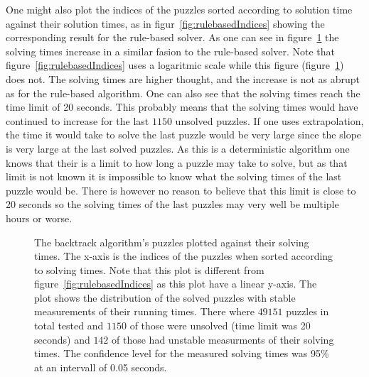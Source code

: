 \documentclass[a4paper,11pt]{kth-mag}
\begin{document}
\FloatBarrier
One might also plot the indices of the puzzles sorted according to solution time against their solution times, as in figur~\ref{fig:rulebasedIndices} showing the corresponding result for the rule-based solver.
As one can see in figure~\ref{fig:backtrackIndices} the solving times increase in a similar fasion to the rule-based solver.
Note that figure~\ref{fig:rulebasedIndices} uses a logaritmic scale while this figure (figure~\ref{fig:backtrackIndices}) does not.
The solving times are higher thought, and the increase is not as abrupt as for the rule-based algorithm.
One can also see that the solving times reach the time limit of 20 seconds.
This probably means that the solving times would have continued to increase for the last $1150$ unsolved puzzles.
If one uses extrapolation, the time it would take to solve the last puzzle would be very large since the slope is very large at the last solved puzzles. 
As this is a deterministic algorithm one knows that their is a limit to how long a puzzle may take to solve, but as that limit is not known it is impossible to know what the solving times of the last puzzle would be.
There is however no reason to believe that this limit is close to 20 seconds so the solving times of the last puzzles may very well be multiple hours or worse.
\\
\begin{figure}[here] 
\noindent{}
\vspace{-15pt}
\caption{The backtrack algorithm's puzzles plotted against their solving times. The x-axis is the indices of the puzzles when sorted according to solving times. Note that this plot is different from figure~\ref{fig:rulebasedIndices} as this plot have a linear y-axis. The plot shows the distribution of the solved puzzles with stable measurements of their running times. There where $49151$ puzzles in total tested and $1150$ of those were unsolved (time limit was 20 seconds) and $142$ of those had unstable measurments of their solving times. The confidence level for the measured solving times was 95\% at an intervall of 0.05 seconds.}
\label{fig:backtrackIndices}
\end{figure}
\end{document}
